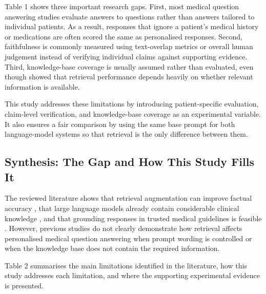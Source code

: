 Table 1 shows three important research gaps. First, most medical question answering studies evaluate answers to questions rather than answers tailored to individual patients. As a result, responses that ignore a patient's medical history or medications are often scored the same as personalised responses. Second, faithfulness is commonly measured using text-overlap metrics or overall human judgement instead of verifying individual claims against supporting evidence. Third, knowledge-base coverage is usually assumed rather than evaluated, even though \citet{xiong2024} showed that retrieval performance depends heavily on whether relevant information is available.

This study addresses these limitations by introducing patient-specific evaluation, claim-level verification, and knowledge-base coverage as an experimental variable. It also ensures a fair comparison by using the same base prompt for both language-model systems so that retrieval is the only difference between them.

\subsection{Synthesis: The Gap and How This Study Fills It}

The reviewed literature shows that retrieval augmentation can improve factual accuracy \citep{lewis2020,shuster2021}, that large language models already contain considerable clinical knowledge \citep{singhal2023}, and that grounding responses in trusted medical guidelines is feasible \citep{zakka2024}. However, previous studies do not clearly demonstrate how retrieval affects personalised medical question answering when prompt wording is controlled or when the knowledge base does not contain the required information.

Table 2 summarises the main limitations identified in the literature, how this study addresses each limitation, and where the supporting experimental evidence is presented.

